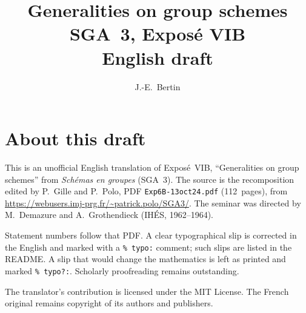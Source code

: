 \documentclass[11pt,a4paper,oneside]{amsbook}
\title[SGA~3, Expos\'e VIB (English draft)]{Generalities on group schemes\\
{\normalsize SGA~3, Expos\'e VIB\\English draft}}
\author{J.-E.\ Bertin}
\date{}
\begin{document}
\frontmatter
\maketitle

\chapter*{About this draft}
This is an unofficial English translation of Expos\'e~VIB, ``Generalities on group schemes''
from \textit{Sch\'emas en groupes} (SGA~3).
The source is the recomposition edited by P.~Gille and P.~Polo,
PDF \texttt{Exp6B-13oct24.pdf} (112~pages),
from \url{https://webusers.imj-prg.fr/~patrick.polo/SGA3/}.
The seminar was directed by M.~Demazure and A.~Grothendieck
(IH\'ES, 1962--1964).

Statement numbers follow that PDF. A clear typographical slip is
corrected in the English and marked with a \texttt{\% typo:} comment;
such slips are listed in the README. A slip that would change the
mathematics is left as printed and marked \texttt{\% typo?:}.
Scholarly proofreading remains outstanding.

The translator's contribution is licensed under the MIT License.
The French original remains copyright of its authors and publishers.

\tableofcontents
\mainmatter


















\end{document}

